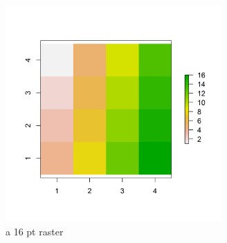 \begin{figure}
\begin{center}
\includegraphics[height=3.25in,width=3.25in]{Ch10/figs/raster}
\end{center}
\caption{a 16 pt raster}
\label{ecoldist.fig.raster}
\end{figure}

